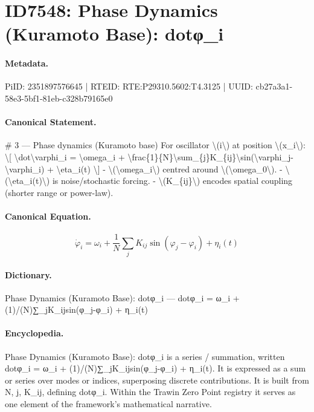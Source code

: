 \section*{ID7548: Phase Dynamics (Kuramoto Base): dotφ\_i}
\paragraph{Metadata.}
PiID: 2351897576645 | RTEID: RTE:P29310.5602:T4.3125 | UUID: cb27a3a1-58e3-5bf1-81eb-c328b79165e0

\paragraph{Canonical Statement.}
\# 3 — Phase dynamics (Kuramoto base) For oscillator \textbackslash{}(i\textbackslash{}) at position \textbackslash{}(x\_i\textbackslash{}): \textbackslash{}[ \textbackslash{}dot\textbackslash{}varphi\_i = \textbackslash{}omega\_i + \textbackslash{}frac\{1\}\{N\}\textbackslash{}sum\_\{j\}K\_\{ij\}\textbackslash{}sin(\textbackslash{}varphi\_j-\textbackslash{}varphi\_i) + \textbackslash{}eta\_i(t) \textbackslash{}] - \textbackslash{}(\textbackslash{}omega\_i\textbackslash{}) centred around \textbackslash{}(\textbackslash{}omega\_0\textbackslash{}). - \textbackslash{}(\textbackslash{}eta\_i(t)\textbackslash{}) is noise/stochastic forcing. - \textbackslash{}(K\_\{ij\}\textbackslash{}) encodes spatial coupling (shorter range or power-law).

\paragraph{Canonical Equation.}
\[
\dot\varphi_i = \omega_i + \frac{1}{N}\sum_{j}K_{ij}\sin(\varphi_j-\varphi_i) + \eta_i(t)
\]

\paragraph{Dictionary.}
Phase Dynamics (Kuramoto Base): dotφ\_i — dotφ\_i = ω\_i + (1)/(N)∑\_jK\_ijsin(φ\_j-φ\_i) + η\_i(t)

\paragraph{Encyclopedia.}
Phase Dynamics (Kuramoto Base): dotφ\_i is a series / summation, written dotφ\_i = ω\_i + (1)/(N)∑\_jK\_ijsin(φ\_j-φ\_i) + η\_i(t). It is expressed as a sum or series over modes or indices, superposing discrete contributions. It is built from N, j, K\_ij, defining dotφ\_i. Within the Trawin Zero Point registry it serves as one element of the framework's mathematical narrative.
